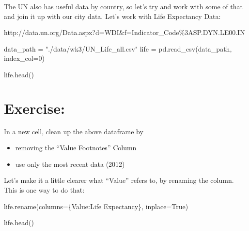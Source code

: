 \documentclass[
  letterpaper,
  DIV=11,
  numbers=noendperiod]{scrreprt}
\newenvironment{Shaded}{\begin{snugshade}}{\end{snugshade}}
\newcommand{\DecValTok}[1]{\textcolor[rgb]{0.68,0.00,0.00}{#1}}
\newcommand{\NormalTok}[1]{\textcolor[rgb]{0.00,0.23,0.31}{#1}}
\newcommand{\OperatorTok}[1]{\textcolor[rgb]{0.37,0.37,0.37}{#1}}
\newcommand{\StringTok}[1]{\textcolor[rgb]{0.13,0.47,0.30}{#1}}
\newcommand{\VariableTok}[1]{\textcolor[rgb]{0.07,0.07,0.07}{#1}}
\providecommand{\tightlist}{%
  \setlength{\itemsep}{0pt}\setlength{\parskip}{0pt}}\usepackage{longtable,booktabs,array}
\begin{document}
The UN also has useful data by country, so let's try and work with some
of that and join it up with our city data. Let's work with Life
Expectancy Data:

http://data.un.org/Data.aspx?d=WDI\&f=Indicator\_Code\%3ASP.DYN.LE00.IN

\begin{Shaded}
\begin{Highlighting}[]
\NormalTok{data\_path }\OperatorTok{=} \StringTok{"./data/wk3/UN\_Life\_all.csv"}
\NormalTok{life }\OperatorTok{=}\NormalTok{ pd.read\_csv(data\_path, index\_col}\OperatorTok{=}\DecValTok{0}\NormalTok{)}
\end{Highlighting}
\end{Shaded}

\begin{Shaded}
\begin{Highlighting}[]
\NormalTok{life.head()}
\end{Highlighting}
\end{Shaded}

\hypertarget{exercise-16}{%
\section{Exercise:}\label{exercise-16}}

In a new cell, clean up the above dataframe by

\begin{itemize}
\tightlist
\item
  removing the ``Value Footnotes'' Column
\item
  use only the most recent data (2012)
\end{itemize}

Let's make it a little clearer what ``Value'' refers to, by renaming the
column. This is one way to do that:

\begin{Shaded}
\begin{Highlighting}[]
\NormalTok{life.rename(columns}\OperatorTok{=}\NormalTok{\{}\StringTok{\textquotesingle{}Value\textquotesingle{}}\NormalTok{:}\StringTok{\textquotesingle{}Life Expectancy\textquotesingle{}}\NormalTok{\}, inplace}\OperatorTok{=}\VariableTok{True}\NormalTok{)}
\end{Highlighting}
\end{Shaded}

\begin{Shaded}
\begin{Highlighting}[]
\NormalTok{life.head()}
\end{Highlighting}
\end{Shaded}
\end{document}
